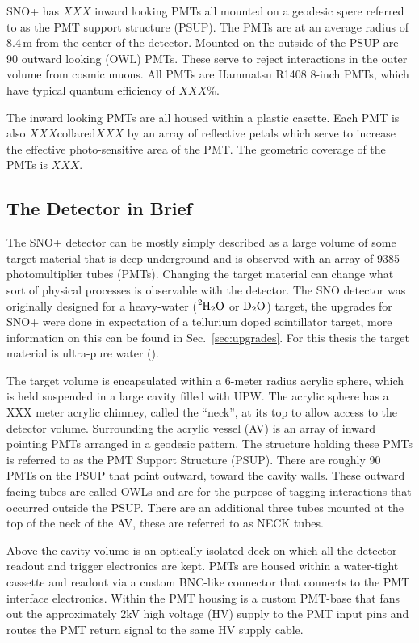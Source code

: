 SNO+ has $XXX$ inward looking PMTs all mounted on a geodesic spere referred to as
the PMT support structure (PSUP). The PMTs are at an average radius of 8.4\,m from
the center of the detector.
Mounted on the outside of the PSUP are 90 outward looking (OWL) PMTs.
These serve to reject interactions in the outer volume from cosmic muons.
All PMTs are Hammatsu R1408 8-inch PMTs, which have typical quantum efficiency
of  $XXX$\%.

The inward looking PMTs are all housed within a plastic casette.
Each PMT is also $XXX$collared$XXX$ by an array of reflective
petals which serve to increase the effective photo-sensitive area
of the PMT.
The geometric coverage of the PMTs is $XXX$. %



\subsection{The Detector in Brief}
The SNO+ detector can be mostly simply described as a large volume of some
target material that is deep underground and is observed with an array of
9385  photomultiplier tubes (PMTs).
Changing the target material can change what sort of physical processes is
observable with the detector.
The SNO detector was originally designed for a heavy-water ($\ce{^{2}H_{2}O}$ or $\ce{D_{2}O}$)
target, the upgrades for SNO+ were done in expectation of a tellurium doped
scintillator target, more information on this can be found in Sec.~\ref{sec:upgrades}.
For this thesis the target material is ultra-pure water ().

The target volume is encapsulated within a 6-meter radius acrylic sphere,
which is held suspended in a large cavity filled with UPW.
The acrylic sphere has a XXX meter acrylic chimney, called the ``neck'', at its top
to allow access to the detector volume.
Surrounding the acrylic vessel (AV) is an  array of inward pointing PMTs
arranged in a geodesic pattern.
The structure holding these PMTs is referred to as the PMT Support Structure
(PSUP).
There are roughly 90 PMTs on the PSUP that point outward, toward the cavity
walls.
These outward facing tubes are called OWLs and are for the purpose of tagging
interactions that occurred outside the PSUP.
There are an additional three tubes mounted at the top of the neck of the AV,
these are referred to as NECK tubes.

Above the cavity volume is an optically isolated deck on which all the detector
readout and trigger electronics are kept.
PMTs are housed within a water-tight cassette and readout via a custom BNC-like
connector that connects to the PMT interface electronics.
Within the PMT housing is a custom PMT-base that fans out the approximately 2kV
high voltage (HV) supply to the PMT input pins and routes the PMT return signal to the same
HV supply cable.


